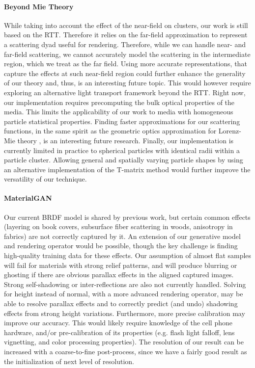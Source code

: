 \paragraph{Beyond Mie Theory}
While taking into account the effect of the near-field on clusters, our work is still based on the RTT. Therefore it relies on the far-field approximation to represent a scattering dyad useful for rendering. Therefore, while we can handle near- and far-field scattering, we cannot accurately model the scattering in the intermediate region, which we treat as the far field. Using more accurate representations, that capture the effects at such near-field region could further enhance the generality of our theory and, thus, is an interesting future topic. This would however require exploring an alternative light transport framework beyond the RTT.
Right now, our implementation requires precomputing the bulk optical properties of the media. This limits the applicability of our work to media with homogeneous particle statistical properties. Finding faster approximations for our scattering functions, in the same spirit as the geometric optics approximation for Lorenz-Mie theory \cite{glantschnig1981light}, is an interesting future research. 
Finally, our implementation is currently limited in practice to spherical particles with identical radii within a particle cluster. Allowing general and spatially varying particle shapes by using an alternative implementation of the T-matrix method would further improve the versatility of our technique.

\paragraph{MaterialGAN}
Our current BRDF model is shared by previous work, but certain common effects (layering on book covers, subsurface fiber scattering in woods, anisotropy in fabrics) are not correctly captured by it. An extension of our generative model and rendering operator would be possible, though the key challenge is finding high-quality  training data for these effects.
Our assumption of almost flat samples will fail for materials with strong relief patterns, and will produce blurring or ghosting if there are obvious parallax effects in the aligned captured images. Strong self-shadowing or inter-reflections are also not currently handled. Solving for height instead of normal, with a more advanced rendering operator, may be able to resolve parallax effects and to correctly predict (and undo) shadowing effects from strong height variations.
Furthermore, more precise calibration may improve our accuracy. This would likely require knowledge of the cell phone hardware, and/or pre-calibration of its properties (e.g. flash light falloff, lens vignetting, and color processing properties).
The resolution of our result can be increased with a coarse-to-fine post-process, since we have a fairly good result as the initialization of next level of resolution.

